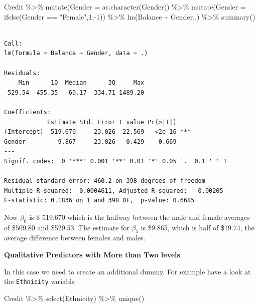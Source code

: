 \documentclass[
  letterpaper,
  DIV=11,
  numbers=noendperiod]{scrreprt}
\newenvironment{Shaded}{\begin{snugshade}}{\end{snugshade}}
\newcommand{\AttributeTok}[1]{\textcolor[rgb]{0.65,0.35,0.00}{#1}}
\newcommand{\DecValTok}[1]{\textcolor[rgb]{0.47,0.16,0.63}{#1}}
\newcommand{\FunctionTok}[1]{\textcolor[rgb]{0.02,0.16,0.49}{#1}}
\newcommand{\NormalTok}[1]{\textcolor[rgb]{0.33,0.33,0.33}{#1}}
\newcommand{\SpecialCharTok}[1]{\textcolor[rgb]{0.00,0.46,0.62}{#1}}
\newcommand{\StringTok}[1]{\textcolor[rgb]{0.00,0.50,0.00}{#1}}
\begin{document}
\begin{Shaded}
\begin{Highlighting}[]
\NormalTok{Credit }\SpecialCharTok{\%\textgreater{}\%} 
  \FunctionTok{mutate}\NormalTok{(}\AttributeTok{Gender =} \FunctionTok{as.character}\NormalTok{(Gender)) }\SpecialCharTok{\%\textgreater{}\%} 
  \FunctionTok{mutate}\NormalTok{(}\AttributeTok{Gender =} \FunctionTok{ifelse}\NormalTok{(Gender }\SpecialCharTok{==} \StringTok{"Female"}\NormalTok{,}\DecValTok{1}\NormalTok{,}\SpecialCharTok{{-}}\DecValTok{1}\NormalTok{)) }\SpecialCharTok{\%\textgreater{}\%} 
  \FunctionTok{lm}\NormalTok{(Balance }\SpecialCharTok{\textasciitilde{}}\NormalTok{ Gender,.) }\SpecialCharTok{\%\textgreater{}\%} 
  \FunctionTok{summary}\NormalTok{()}
\end{Highlighting}
\end{Shaded}

\begin{verbatim}

Call:
lm(formula = Balance ~ Gender, data = .)

Residuals:
    Min      1Q  Median      3Q     Max 
-529.54 -455.35  -60.17  334.71 1489.20 

Coefficients:
            Estimate Std. Error t value Pr(>|t|)    
(Intercept)  519.670     23.026  22.569   <2e-16 ***
Gender         9.867     23.026   0.429    0.669    
---
Signif. codes:  0 '***' 0.001 '**' 0.01 '*' 0.05 '.' 0.1 ' ' 1

Residual standard error: 460.2 on 398 degrees of freedom
Multiple R-squared:  0.0004611, Adjusted R-squared:  -0.00205 
F-statistic: 0.1836 on 1 and 398 DF,  p-value: 0.6685
\end{verbatim}

Now \(\beta_0\) is \$ 519.670 which is the halfway between the male and
female averages of \$509.80 and \$529.53. The estimate for \(\beta_1\)
is \$9.865, which is half of \$19.74, the average difference between
females and males.

\textbf{Qualitative Predictors with More than Two levels}

In this case we need to create an additional dummy. For example have a
look at the \texttt{Ethnicity} variable

\begin{Shaded}
\begin{Highlighting}[]
\NormalTok{Credit }\SpecialCharTok{\%\textgreater{}\%} \FunctionTok{select}\NormalTok{(Ethnicity) }\SpecialCharTok{\%\textgreater{}\%} \FunctionTok{unique}\NormalTok{()}
\end{Highlighting}
\end{Shaded}
\end{document}
